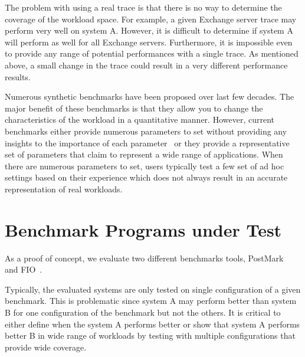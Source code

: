 The problem with using a real trace is that there is no way to determine the coverage of the workload space. 
For example, a given Exchange server trace may perform very well on system A. 
However, it is difficult to determine if system A will perform as well for all Exchange servers. 
Furthermore, it is impossible even to provide any range of potential performances with a single trace. 
As mentioned above, a small change in the trace could result in a very different performance results.

Numerous synthetic benchmarks have been proposed over last few decades. 
The major benefit of these benchmarks is that they allow you to change the characteristics of the workload in a quantitative manner. 
However, current benchmarks either provide numerous parameters to set without providing any insights to the importance of each parameter~\cite{axboe:2008, vandenbergh:2008, katcher:1997, wolman:1989, norcott:2006, coker:2001} or they provide a representative set of parameters that claim to represent a wide range of applications. 
When there are numerous parameters to set, users typically test a few set of ad hoc settings based on their experience which does not always  result in an accurate representation of real workloads. 

\section{Benchmark Programs under Test}
As a proof of concept, we evaluate two different benchmarks tools, PostMark~\cite{katcher:1997} and FIO~\cite{axboe:2008}.

Typically, the evaluated systems are only tested on single configuration of a given benchmark. 
This is problematic since system A may perform better than system B for one configuration of the benchmark but not the others. 
It is critical to either define when the system A performs better or show that system A performs better B in wide range of workloads by testing with multiple configurations that provide wide coverage. 

